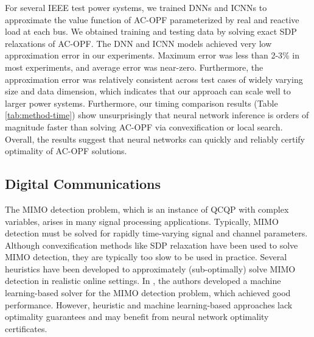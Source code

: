 \documentclass[10pt]{article} %
\theoremstyle{plain}
\theoremstyle{definition}
\theoremstyle{remark}
\begin{document}
For several IEEE test power systems, we trained DNNs and ICNNs to approximate the value function of AC-OPF parameterized by real and reactive load at each bus. We obtained training and testing data by solving exact SDP relaxations of AC-OPF. The DNN and ICNN models achieved very low approximation error in our experiments. Maximum error was less than 2-3\% in most experiments, and average error was near-zero. 
Furthermore, the approximation error was relatively consistent across test cases of widely varying size and data dimension, which indicates that our approach can scale well to larger power systems.
Furthermore, our timing comparison results (Table \ref{tab:method-time}) show unsurprisingly that neural network inference is orders of magnitude faster than solving AC-OPF via convexification or local search. Overall, the results suggest that neural networks can quickly and reliably certify optimality of AC-OPF solutions.

\subsection{Digital Communications}

The MIMO detection problem, which is an instance of QCQP with complex variables, arises in many signal processing applications. Typically, MIMO detection must be solved for rapidly time-varying signal and channel parameters. Although convexification methods like SDP relaxation have been used to solve MIMO detection, they are typically too slow to be used in practice. Several heuristics have been developed to approximately (sub-optimally) solve MIMO detection in realistic online settings. In \citet{samuel2017deep}, the authors developed a machine learning-based solver for the MIMO detection problem, which achieved good performance. However, heuristic and machine learning-based approaches lack optimality guarantees and may benefit from neural network optimality certificates.
\end{document}
